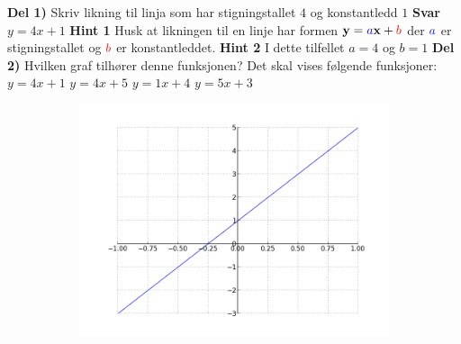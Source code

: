 \documentclass[12pt,twoside,onecolumn]{article}
\begin{document}
\begin{Exercise}
\textbf{Del 1)}
\newline
Skriv likning til linja som har stigningstallet $4$ og konstantledd $1$
\newline
\textbf{Svar}
\newline  
$y=4x+1$
\newline
\textbf{Hint 1}
\newline
Husk at likningen til en linje har formen $\mathbf{y} = {\color{blue}a}\mathbf{x}+ {\color{red}b}$ der ${\color{blue}a}$ er {\color{blue}stigningstallet} og ${\color{red}b}$ er {\color{red}konstantleddet}.
\newline
\textbf{Hint 2}
\newline
I dette tilfellet $a=4$ og $b=1$
\newline\newline
\textbf{Del 2)} 
\newline\newline
Hvilken graf tilhører denne funksjonen? 
\newline
{\color{Maroon}Det skal vises følgende funksjoner:
\newline
$y=4x+1$
\newline
$y=4x+5$
\newline
$y=1x+4$
\newline
$y=5x+3$
}
\begin{figure}[h!]
\centering
    \begin{subfigure}{.5\textwidth}
    \centering
    \includegraphics[scale = 0.5]{figures/4Xp1.png}
    \end{subfigure}%
    \begin{subfigure}{.5\textwidth}

\end{subfigure}
\end{figure}
\end{Exercise}
\end{document}
